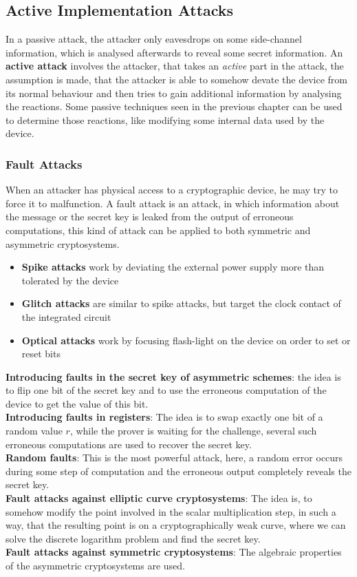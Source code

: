 \documentclass[a4paper, 10 pt, conference]{ieeeconf}
\begin{document}
\subsection{\textbf{Active Implementation Attacks}}
In a passive attack, the attacker only eavesdrops on some side-channel information, which is analysed afterwards to reveal some secret information. An \textbf{active attack} involves the attacker, that takes an \emph{active} part in the attack, the assumption is made, that the attacker is able to somehow devate the device from its normal behaviour and then tries to gain additional information by analysing the reactions. Some passive techniques seen in the previous chapter can be used to determine those reactions, like modifying some internal data used by the device. 
\vspace{0.5cm}
\subsubsection{\textbf{Fault Attacks}}
When an attacker has physical access to a cryptographic device, he may try to force it to malfunction. 
A fault attack is an attack, in which information about the message or the secret key is leaked from the output of erroneous computations, this kind of attack can be applied to both symmetric and asymmetric cryptosystems. 
\begin{itemize}
\item \textbf{Spike attacks} work by deviating the external power supply more than tolerated by the device
\item \textbf{Glitch attacks} are similar to spike attacks, but target the clock contact of the integrated circuit
\item \textbf{Optical attacks} work by focusing flash-light on the device on order to set or reset bits
\end{itemize}
\textbf{Introducing faults in the secret key of asymmetric schemes}: the idea is to flip one bit of the secret key and to use the erroneous computation of the device to get the value of this bit. \\
\textbf{Introducing faults in registers}: The idea is to swap exactly one bit of a random value $r$, while the prover is waiting for the challenge, several such erroneous computations are used to recover the secret key. \\
\textbf{Random faults}: This is the most powerful attack, here, a random error occurs during some step of computation and the erroneous output completely reveals the secret key. \\
\textbf{Fault attacks against elliptic curve cryptosystems}: The idea is, to somehow modify the point involved in the scalar multiplication step, in such a way, that the resulting point is on a cryptographically weak curve, where we can solve the discrete logarithm problem and find the secret key. \\
\textbf{Fault attacks against symmetric cryptosystems}: The algebraic properties of the asymmetric cryptosystems are used. 
\end{document}
